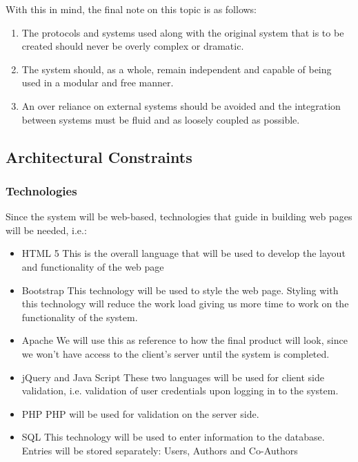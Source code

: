 \documentclass[hidelinks,a4paper,12pt]{article}
\begin{document}
	With this in mind, the final note on this topic is as follows: 
	\begin{enumerate}
		\item The protocols and systems used along with the original system that is to be created should never be overly complex or dramatic. 
		\item The system should, as a whole, remain independent and capable of being used in a modular and free manner. 
		\item An over reliance on external systems should be avoided and the integration between systems must be fluid and as loosely coupled as possible.
	\end{enumerate}
	
	\subsection{Architectural Constraints}
			\subsubsection{Technologies}
		Since the system will be web-based, technologies that guide in building web pages will be needed, i.e.:
		
		\begin{itemize} 
			\item HTML 5
			\newline
			This is the overall language that will be used to develop the layout and functionality of the web page
				\item Bootstrap
				\newline
			This technology will be used to style the web page. Styling with this technology will reduce the work load giving us more time to work on the 				functionality of the system.
				\item Apache
				\newline
			We will use this as reference to how the final product will look, since we won’t have access to the client’s server until the system is completed.	
				\item jQuery and Java Script
				\newline
			These two languages will be used for client side validation, i.e. validation of user credentials upon logging in to the system.	
				\item PHP
				\newline
			PHP will be used for validation on the server side.	
				\item SQL
				\newline  
			This technology will be used to enter information to the database. Entries will be stored separately:
			Users,
			Authors and Co-Authors
		\end{itemize}
				
\end{document}
